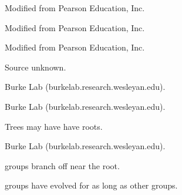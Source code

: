 \documentclass[t]{beamer}
\begin{document}
%
{
\begin{frame}[b]

\tiny Modified from \textcopyright Pearson Education, Inc.
\end{frame}
}
%
{
\begin{frame}[b]

\tiny Modified from \textcopyright Pearson Education, Inc.
\end{frame}
}
%
{
\begin{frame}[b]

\tiny Modified from \textcopyright Pearson Education, Inc.
\end{frame}
}
{
\begin{frame}[b]

\hfill\tiny Source unknown.
\end{frame}
}
%
{
\begin{frame}[b]

\tiny Burke Lab (burkelab.research.wesleyan.edu).
\end{frame}
}
%
{
\begin{frame}[b]

\tiny Burke Lab (burkelab.research.wesleyan.edu).
\end{frame}
}
%
{
\begin{frame}[b]{Trees may have have roots.}

\tiny Burke Lab (burkelab.research.wesleyan.edu).
\end{frame}
}
{
\begin{frame}[b]{ groups branch off near the root.}

\end{frame}
}
%
{
\begin{frame}[b]{ groups have evolved for as long as other groups.}

\end{frame}
}
\end{document}
